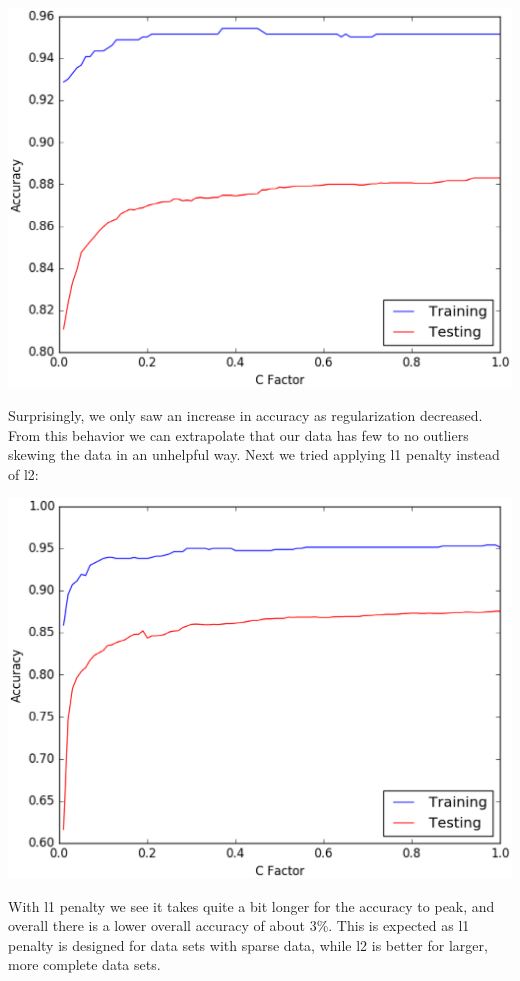 \documentclass{article} %
\begin{document}
	 \includegraphics[scale=.75]{l2penalty}


	 Surprisingly, we only saw an increase in accuracy as regularization decreased. From
	 this behavior we can extrapolate that our data has few to no outliers skewing the
	 data in an unhelpful way. Next we tried applying l1 penalty instead of l2:


	 \includegraphics[scale=.75]{l1penalty}


	 With l1 penalty we see it takes quite a bit longer for the accuracy to peak, and
	 overall there is a lower overall accuracy of about 3\%. This is expected as l1
	 penalty is designed for data sets with sparse data, while l2 is better for larger,
	 more complete data sets.
\end{document}
